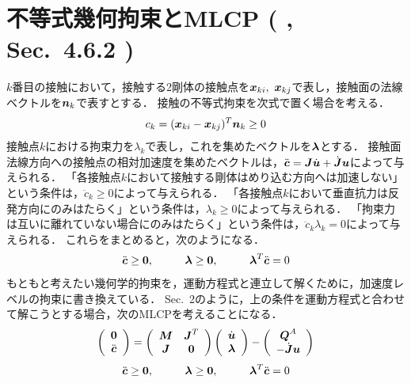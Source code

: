 \documentclass{jsarticle}
\begin{document}
\section{不等式幾何拘束とMLCP ( \cite{MThesis2005Garstenauer}, Sec.~4.6.2 )}
$k$番目の接触において，接触する2剛体の接触点を$\mbox{\boldmath $x$}_{ki},~\mbox{\boldmath $x$}_{kj}$で表し，接触面の法線ベクトルを$\mbox{\boldmath $n$}_k$で表すとする．
接触の不等式拘束を次式で置く場合を考える．
\begin{align*}
 c_k=(\mbox{\boldmath $x$}_{ki}-\mbox{\boldmath $x$}_{kj})^T\mbox{\boldmath $n$}_k\ge0
\end{align*}
接触点$k$における拘束力を$\lambda_k$で表し，これを集めたベクトルを$\mbox{\boldmath $\lambda$}$とする．
接触面法線方向への接触点の相対加速度を集めたベクトルは，$\ddot{\mbox{\boldmath $c$}}=\mbox{\boldmath $J$}\dot{\mbox{\boldmath $u$}}+\dot{\mbox{\boldmath $J$}}\mbox{\boldmath $u$}$によって与えられる．
「各接触点$k$において接触する剛体はめり込む方向へは加速しない」という条件は，$\ddot{c}_k\ge0$によって与えられる．
「各接触点$k$において垂直抗力は反発方向にのみはたらく」という条件は，$\lambda_k\ge0$によって与えられる．
「拘束力は互いに離れていない場合にのみはたらく」という条件は，$\ddot{c}_k\lambda_k=0$によって与えられる．
これらをまとめると，次のようになる．
\begin{align*}
 \ddot{\vc}\ge\0,
 \hspace{10mm}\vlambda\ge\0,
 \hspace{10mm}\vlambda^T\ddot{\vc}=0
\end{align*}
もともと考えたい幾何学的拘束を，運動方程式と連立して解くために，加速度レベルの拘束に書き換えている．
Sec.~2のように，上の条件を運動方程式と合わせて解こうとする場合，次のMLCPを考えることになる．
\begin{align}
   \left(
    \begin{array}{c}
       \mbox{\bf 0}\\
       \ddot{\mbox{\boldmath $c$}}
    \end{array}
   \right)
=
   \left(
    \begin{array}{cc}
       \mbox{\boldmath $M$}   & \mbox{\boldmath $J$}^T\\
       \mbox{\boldmath $J$}   & \mbox{\bf 0}
    \end{array}
   \right)
   \left(
    \begin{array}{c}
       \dot{\mbox{\boldmath $u$}}\\
       \mbox{\boldmath $\lambda$}
    \end{array}
   \right)
-
   \left(
    \begin{array}{c}
       \mbox{\boldmath $Q$}^A\\
       -\dot{\mbox{\boldmath $J$}}\mbox{\boldmath $u$}
    \end{array}
   \right)\label{NE_equation''}
\end{align}
\begin{align*}
 \ddot{\vc}\ge\0,
 \hspace{10mm}\vlambda\ge\0,
 \hspace{10mm}\vlambda^T\ddot{\vc}=0
\end{align*}
\end{document}
